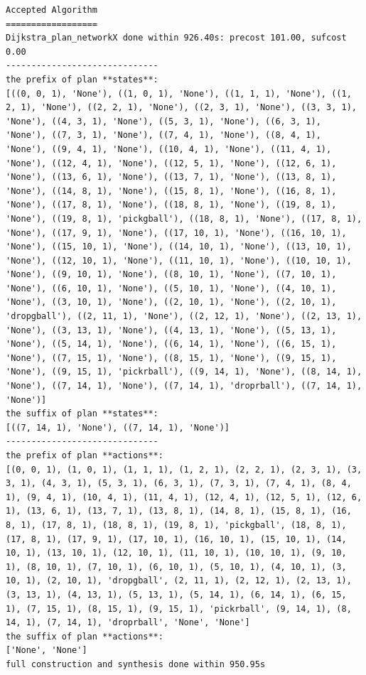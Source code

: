 \begin{lstlisting}
Accepted Algorithm
==================
Dijkstra_plan_networkX done within 926.40s: precost 101.00, sufcost 0.00
------------------------------
the prefix of plan **states**:
[((0, 0, 1), 'None'), ((1, 0, 1), 'None'), ((1, 1, 1), 'None'), ((1, 2, 1), 'None'), ((2, 2, 1), 'None'), ((2, 3, 1), 'None'), ((3, 3, 1), 'None'), ((4, 3, 1), 'None'), ((5, 3, 1), 'None'), ((6, 3, 1), 'None'), ((7, 3, 1), 'None'), ((7, 4, 1), 'None'), ((8, 4, 1), 'None'), ((9, 4, 1), 'None'), ((10, 4, 1), 'None'), ((11, 4, 1), 'None'), ((12, 4, 1), 'None'), ((12, 5, 1), 'None'), ((12, 6, 1), 'None'), ((13, 6, 1), 'None'), ((13, 7, 1), 'None'), ((13, 8, 1), 'None'), ((14, 8, 1), 'None'), ((15, 8, 1), 'None'), ((16, 8, 1), 'None'), ((17, 8, 1), 'None'), ((18, 8, 1), 'None'), ((19, 8, 1), 'None'), ((19, 8, 1), 'pickgball'), ((18, 8, 1), 'None'), ((17, 8, 1), 'None'), ((17, 9, 1), 'None'), ((17, 10, 1), 'None'), ((16, 10, 1), 'None'), ((15, 10, 1), 'None'), ((14, 10, 1), 'None'), ((13, 10, 1), 'None'), ((12, 10, 1), 'None'), ((11, 10, 1), 'None'), ((10, 10, 1), 'None'), ((9, 10, 1), 'None'), ((8, 10, 1), 'None'), ((7, 10, 1), 'None'), ((6, 10, 1), 'None'), ((5, 10, 1), 'None'), ((4, 10, 1), 'None'), ((3, 10, 1), 'None'), ((2, 10, 1), 'None'), ((2, 10, 1), 'dropgball'), ((2, 11, 1), 'None'), ((2, 12, 1), 'None'), ((2, 13, 1), 'None'), ((3, 13, 1), 'None'), ((4, 13, 1), 'None'), ((5, 13, 1), 'None'), ((5, 14, 1), 'None'), ((6, 14, 1), 'None'), ((6, 15, 1), 'None'), ((7, 15, 1), 'None'), ((8, 15, 1), 'None'), ((9, 15, 1), 'None'), ((9, 15, 1), 'pickrball'), ((9, 14, 1), 'None'), ((8, 14, 1), 'None'), ((7, 14, 1), 'None'), ((7, 14, 1), 'droprball'), ((7, 14, 1), 'None')]
the suffix of plan **states**:
[((7, 14, 1), 'None'), ((7, 14, 1), 'None')]
------------------------------
the prefix of plan **actions**:
[(0, 0, 1), (1, 0, 1), (1, 1, 1), (1, 2, 1), (2, 2, 1), (2, 3, 1), (3, 3, 1), (4, 3, 1), (5, 3, 1), (6, 3, 1), (7, 3, 1), (7, 4, 1), (8, 4, 1), (9, 4, 1), (10, 4, 1), (11, 4, 1), (12, 4, 1), (12, 5, 1), (12, 6, 1), (13, 6, 1), (13, 7, 1), (13, 8, 1), (14, 8, 1), (15, 8, 1), (16, 8, 1), (17, 8, 1), (18, 8, 1), (19, 8, 1), 'pickgball', (18, 8, 1), (17, 8, 1), (17, 9, 1), (17, 10, 1), (16, 10, 1), (15, 10, 1), (14, 10, 1), (13, 10, 1), (12, 10, 1), (11, 10, 1), (10, 10, 1), (9, 10, 1), (8, 10, 1), (7, 10, 1), (6, 10, 1), (5, 10, 1), (4, 10, 1), (3, 10, 1), (2, 10, 1), 'dropgball', (2, 11, 1), (2, 12, 1), (2, 13, 1), (3, 13, 1), (4, 13, 1), (5, 13, 1), (5, 14, 1), (6, 14, 1), (6, 15, 1), (7, 15, 1), (8, 15, 1), (9, 15, 1), 'pickrball', (9, 14, 1), (8, 14, 1), (7, 14, 1), 'droprball', 'None', 'None']
the suffix of plan **actions**:
['None', 'None']
full construction and synthesis done within 950.95s 
\end{lstlisting}
